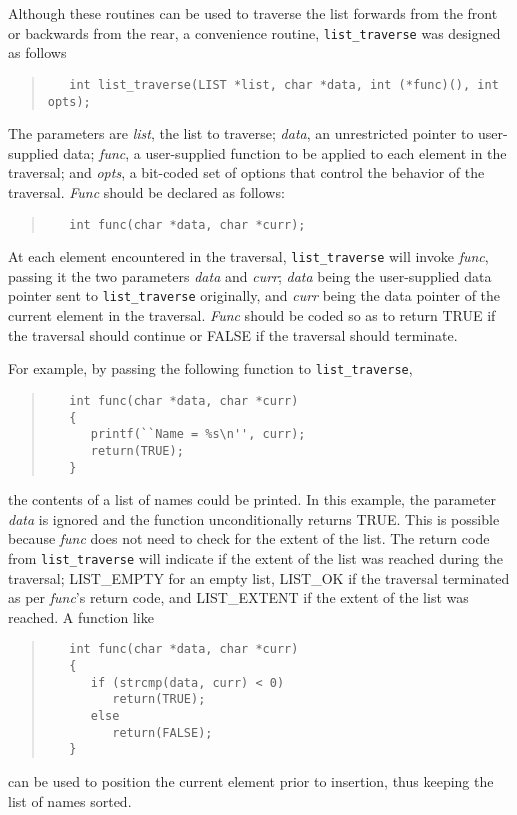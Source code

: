 Although these routines can be used to traverse the list forwards from the
front or backwards from the rear, a convenience routine, {\tt list\_traverse}
was designed as follows
\begin{quote}
\begin{verbatim}
   int list_traverse(LIST *list, char *data, int (*func)(), int opts);
\end{verbatim}
\end{quote}
The parameters are {\em list}, the list to traverse; {\em data}, an
unrestricted pointer to user-supplied data; {\em func}, a user-supplied
function to be applied to each element in the traversal; and {\em opts}, a
bit-coded set of options that control the behavior of the traversal.
{\em Func} should be declared as follows:
\begin{quote}
\begin{verbatim}
   int func(char *data, char *curr);
\end{verbatim}
\end{quote}
At each element encountered in the traversal, {\tt list\_traverse} will invoke
{\em func}, passing it the two parameters {\em data} and {\em curr}; {\em
data} being the user-supplied data pointer sent to {\tt list\_traverse}
originally, and {\em curr} being the data pointer of the current element in
the traversal.  {\em Func} should be coded so as to return TRUE if the
traversal should continue or FALSE if the traversal should terminate.

For example, by passing the following function to {\tt list\_traverse},
\begin{quote}
\begin{verbatim}
   int func(char *data, char *curr)
   {
      printf(``Name = %s\n'', curr);
      return(TRUE);
   }
\end{verbatim}
\end{quote}
the contents of a list of names could be printed.  In this example, the
parameter {\em data} is ignored and the function unconditionally returns TRUE.
This is possible because {\em func} does not need to check for the extent of
the list.  The return code from {\tt list\_traverse} will indicate if the
extent of the list was reached during the traversal; LIST\_EMPTY for an empty
list, LIST\_OK if the traversal terminated as per {\em func}'s return code,
and LIST\_EXTENT if the extent of the list was reached.  A function like
\begin{quote}
\begin{verbatim}
   int func(char *data, char *curr)
   {
      if (strcmp(data, curr) < 0)
         return(TRUE);
      else
         return(FALSE);
   }
\end{verbatim}
\end{quote}
can be used to position the current element prior to insertion, thus keeping
the list of names sorted.

